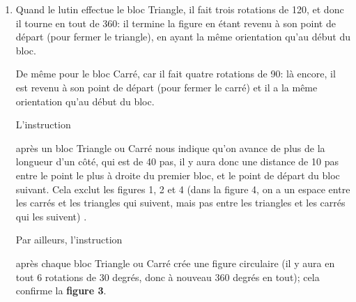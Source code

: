 \begin{enumerate}
	\begin{itemize}
		\item \textbf{K} représente l'angle de rotation de Scratch, pour un angle souhaité de 60\textdegree entre les segments, donc \quad $\textbf{K}=180 -60 =120$;

		\item \textbf{N} représente l'angle de rotation de Scratch, pour un angle souhaité de 90\textdegree entre les segments, donc  \quad $\textbf{N}=180-90=90$.
	\end{itemize}

	\item Quand le lutin effectue le bloc Triangle, il fait trois rotations de 120\textdegree, et donc il tourne en tout de 360\textdegree : il termine la figure en étant revenu à son point de départ (pour fermer le triangle), en ayant la même orientation qu'au début du bloc.

	De même pour le bloc Carré, car il fait quatre rotations de 90\textdegree : là encore, il est revenu à son point de départ (pour fermer le carré) et il a la même orientation qu'au début du bloc.

	L'instruction \begin{scratch}\end{scratch} après un bloc Triangle ou Carré nous indique qu'on avance de plus de la longueur d'un côté, qui est de 40 pas, il y aura donc une distance de 10 pas entre le point le plus à droite du premier bloc, et le point de départ du bloc suivant. Cela exclut les figures 1, 2 et 4 (dans la figure 4, on a un espace entre les carrés et les triangles qui suivent, mais pas entre les triangles et les carrés qui les suivent) 	.

	Par ailleurs, l'instruction \begin{scratch}\end{scratch} après chaque bloc Triangle ou Carré crée une figure \og circulaire \fg{} (il y aura en tout 6 rotations de 30 degrés, donc à nouveau 360 degrés en tout); cela confirme la \textbf{figure 3}.
\end{enumerate}
